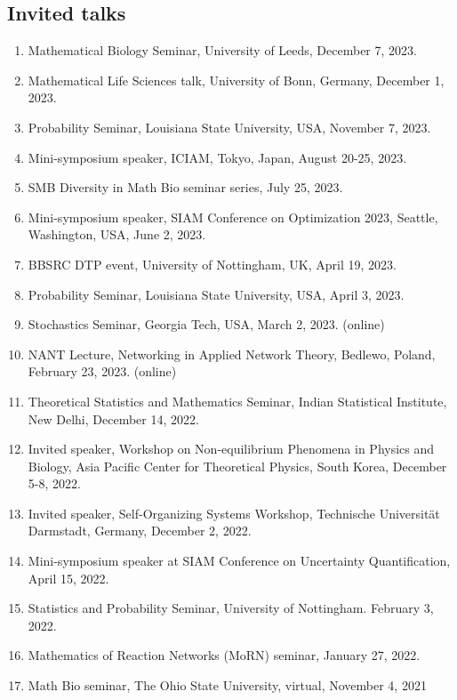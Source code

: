 \documentclass[11pt,a4paper,sans]{moderncv}        %
\begin{document}
\subsection{Invited talks}
\begin{enumerate}
	\item Mathematical Biology Seminar, University of Leeds, December 7, 2023.
	\item Mathematical Life Sciences talk, University of Bonn, Germany, December 1, 2023.
	\item Probability Seminar, Louisiana State University, USA, November 7, 2023.
	\item Mini-symposium speaker, ICIAM, Tokyo, Japan, August 20-25, 2023. 
	\item SMB Diversity in Math Bio seminar series, July 25, 2023. 
	\item Mini-symposium speaker, SIAM Conference on Optimization 2023, Seattle, Washington, USA, June 2, 2023. 
	\item BBSRC DTP event, University of Nottingham, UK, April 19, 2023. 
	\item Probability Seminar, Louisiana State University, USA, April 3, 2023. 
	\item Stochastics Seminar, Georgia Tech, USA, March 2, 2023. (online)
	\item NANT Lecture, Networking in Applied Network Theory, Bedlewo, Poland, February 23, 2023. (online)
	\item Theoretical Statistics and Mathematics Seminar, Indian Statistical Institute, New Delhi, December 14, 2022. 
	\item Invited speaker, Workshop on Non-equilibrium Phenomena in Physics and Biology, Asia Pacific Center for Theoretical Physics, South Korea, December 5-8, 2022.  
	\item Invited speaker, Self-Organizing Systems Workshop, Technische Universit\"at Darmstadt, Germany,  December 2, 2022. 
	\item Mini-symposium speaker at SIAM Conference on Uncertainty Quantification, April 15, 2022. 
	\item Statistics and Probability Seminar, University of Nottingham. February 3, 2022. 
	\item Mathematics of Reaction Networks (MoRN) seminar, January 27, 2022. 
	\item Math Bio seminar, The Ohio State University, virtual, November 4, 2021

\end{enumerate}
\end{document}

